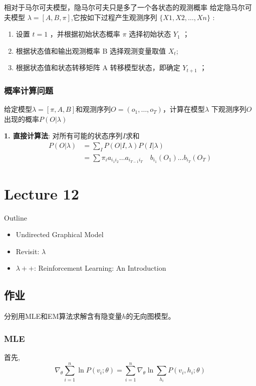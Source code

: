 \documentclass[UTF8]{ctexart}
\numberwithin{equation}{section}
\begin{document}
相对于马尔可夫模型，隐马尔可夫只是多了一个各状态的观测概率
给定隐马尔可夫模型 $\lambda=[A, B, \pi] $,它按如下过程产生观测序列 $\{X 1, X 2,\ldots, X n\}$ :
\begin{enumerate}
    \item 设置 $t=1$ ，并根据初始状态概率 $\pi$ 选择初始状态 $Y_{1}$ ；
    \item 根据状态值和输出观测概率 B 选择观测变量取值 $X_{t}$;
    \item 根据状态值和状态转移矩阵 $\mathrm{A}$ 转移模型状态，即确定 $Y_{t+1}$ ；
\end{enumerate}

\subsubsection{概率计算问题}
给定模型$\lambda=[\pi, A, B]$和观测序列$O=(o_1,\ldots,o_T)$，计算在模型$\lambda$
下观测序列$O$出现的概率$P(O|\lambda)$

\textbf{1. 直接计算法}:
对所有可能的状态序列$I$求和
$$
\begin{aligned}
    P(O|\lambda)
    &=\sum_I P(O|I,\lambda)P(I|\lambda)\\
    &=\sum \pi_i a_{i_1 i_2}\ldots a_{i_{T-1}i_T} \quad b_{i_1}(O_1)\ldots  b_{i_T}(O_T)
\end{aligned}
$$

\section{Lecture 12}
Outline
\begin{itemize}
    \item Undirected Graphical Model
    \item Revisit: $\lambda$
    \item $\lambda ++$: Reinforcement Learning: An Introduction
\end{itemize}

\subsection{作业}
分别用MLE和EM算法求解含有隐变量$h$的无向图模型。


\subsubsection*{MLE}
首先,
\begin{equation}
    \nabla_\theta \sum_{i=1}^n\ln P(v_i; \theta) = \sum_{i=1}^n  \nabla_\theta \ln \sum_{h_i} P(v_i, h_i; \theta) \label{start_eq}
\end{equation}
\end{document}
